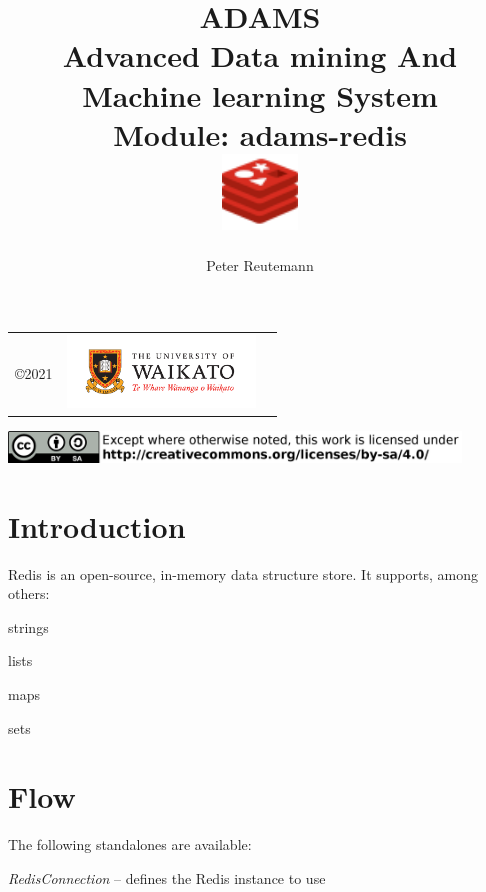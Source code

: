 \documentclass[a4paper]{book}
\title{
  \textbf{ADAMS} \\
  {\Large \textbf{A}dvanced \textbf{D}ata mining \textbf{A}nd \textbf{M}achine
  learning \textbf{S}ystem} \\
  {\Large Module: adams-redis} \\
  \vspace{1cm}
  \includegraphics[width=2cm]{images/redis-module.png} \\
}
\author{
  Peter Reutemann
}
\begin{document}
\begin{titlepage}
\maketitle

\thispagestyle{empty}
\center
\begin{table}[b]
	\begin{tabular}{c l l}
		\parbox[c][2cm]{2cm}{\copyright 2021} &
		\parbox[c][2cm]{5cm}{\includegraphics[width=5cm]{images/coat_of_arms.pdf}} \\
	\end{tabular}
	\includegraphics[width=12cm]{images/cc.png} \\
\end{table}

\end{titlepage}

\tableofcontents

\chapter{Introduction}
Redis\cite{redis} is an open-source, in-memory data structure store. It supports, among others:
\begin{tight_itemize}
  \item strings
  \item lists
  \item maps
  \item sets
\end{tight_itemize}

\chapter{Flow}
The following standalones are available:
\begin{tight_itemize}
  \item \textit{RedisConnection} -- defines the Redis instance to use
\end{tight_itemize}
\end{document}
